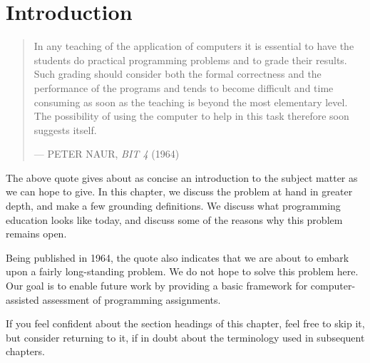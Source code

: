 
\chapter{Introduction}

\begin{quotation}

\footnotesize\sffamily\itshape

\begin{flushright}

In any teaching of the application of computers it is essential to have the
students do practical programming problems and to grade their results. Such
grading should consider both the formal correctness and the performance of the
programs and tends to become difficult and time consuming as soon as the
teaching is beyond the most elementary level.  The possibility of using the
computer to help in this task therefore soon suggests itself.

\smallbreak

\upshape

--- PETER NAUR, {\itshape BIT 4} (1964)

\end{flushright}

\end{quotation}

The above quote gives about as concise an introduction to the subject matter as
we can hope to give. In this chapter, we discuss the problem at hand in greater
depth, and make a few grounding definitions. We discuss what programming
education looks like today, and discuss some of the reasons why this problem
remains open.

Being published in 1964, the quote also indicates that we are about to embark
upon a fairly long-standing problem. We do not hope to solve this problem here.
Our goal is to enable future work by providing a basic framework for
computer-assisted assessment of programming assignments.

If you feel confident about the section headings of this chapter, feel free to
skip it, but consider returning to it, if in doubt about the terminology used
in subsequent chapters.








